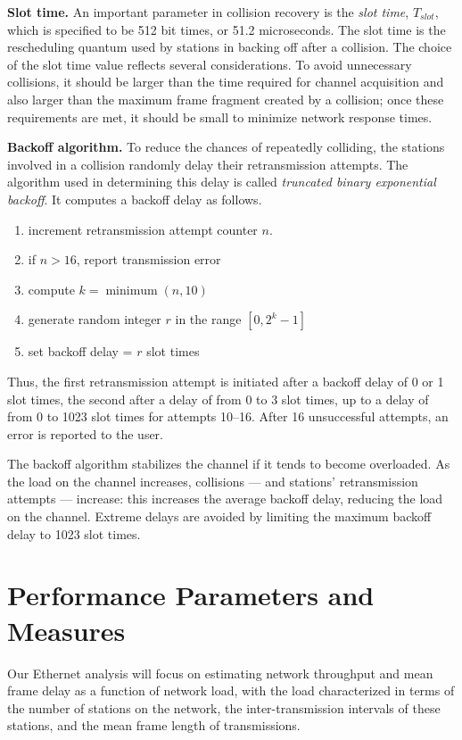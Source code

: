 \noindent\textbf{Slot time.} An important parameter in collision recovery is the \emph{slot time}, $T_{slot}$, which is specified to be 512 bit times, or 51.2 microseconds. The slot time is the rescheduling quantum used by stations in backing off after a collision. The choice of the slot time value reflects several considerations. To avoid unnecessary collisions, it should be larger than the time required for channel acquisition and also larger than the maximum frame fragment created by a collision; once these requirements are met, it should be small to minimize network response times.


\noindent\textbf{Backoff algorithm.} To reduce the chances of repeatedly colliding, the stations involved in a collision randomly delay their retransmission attempts. The algorithm used in determining this delay is called \emph{truncated binary exponential backoff}. It computes a backoff delay as follows.
\begin{enumerate}
\item increment retransmission attempt counter $n$.
\item if $n>16$, report transmission error
\item compute $k=\operatorname{minimum}(n,10)$
\item generate random integer $r$ in the range $[0,2^k-1]$
\item set backoff delay = $r$ slot times
\end{enumerate}
Thus, the first retransmission attempt is initiated after a backoff delay of 0 or 1 slot times, the second after a delay of from 0 to 3 slot times, up to a delay of from 0 to 1023 slot times for attempts 10--16. After 16 unsuccessful attempts, an error is reported to the user.

The backoff algorithm stabilizes the channel if it tends to become overloaded. As the load on the channel increases, collisions --- and stations' retransmission attempts --- increase: this increases the average backoff delay, reducing the load on the channel. Extreme delays are avoided by limiting the maximum backoff delay to 1023 slot times.

\section{Performance Parameters and Measures}

Our Ethernet analysis will focus on estimating network throughput and mean frame delay as a function of network load, with the load characterized in terms of the number of stations on the network, the inter-transmission intervals of these stations, and the mean frame length of transmissions.

